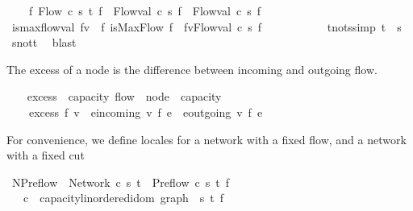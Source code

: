 \begin{isabellebody}
\ \ \ \ {\isacharparenleft}{\isasymforall}f{\isacharprime}{\isachardot}\ Flow\ c\ s\ t\ f{\isacharprime}\ {\isasymlongrightarrow}\ Flow{\isachardot}val\ c\ s\ f{\isacharprime}\ {\isasymle}\ Flow{\isachardot}val\ c\ s\ f{\isacharparenright}{\isachardoublequoteclose}\isanewline
\ \ \ \ \isanewline
\ \ \isamarkupfalse%
\ {\isachardoublequoteopen}is{\isacharunderscore}max{\isacharunderscore}flow{\isacharunderscore}val\ fv\ {\isasymequiv}\ {\isasymexists}f{\isachardot}\ isMaxFlow\ f\ {\isasymand}\ fv{\isacharequal}Flow{\isachardot}val\ c\ s\ f{\isachardoublequoteclose}\isanewline
\isanewline
\ \ \isanewline
\ \ \ \ \isanewline
\ \ \isamarkupfalse%
\ t{\isacharunderscore}not{\isacharunderscore}s{\isacharbrackleft}simp{\isacharbrackright}{\isacharcolon}\ {\isachardoublequoteopen}t\ {\isasymnoteq}\ s{\isachardoublequoteclose}%
\isadelimproof
\ %
\endisadelimproof
%
\isatagproof
{}\isamarkupfalse%
\ s{\isacharunderscore}not{\isacharunderscore}t\ \isamarkupfalse%
\ blast%
\endisatagproof
{\isafoldproof}%
%
\isadelimproof
%
\endisadelimproof
%
\begin{isamarkuptext}%
The excess of a node is the difference between incoming and 
    outgoing flow.%
\end{isamarkuptext}\isamarkuptrue%
\ \ \isamarkupfalse%
\ excess\ {\isacharcolon}{\isacharcolon}\ {\isachardoublequoteopen}{\isacharprime}capacity\ flow\ {\isasymRightarrow}\ node\ {\isasymRightarrow}\ {\isacharprime}capacity{\isachardoublequoteclose}\ \isanewline
\ \ \ \ {\isachardoublequoteopen}excess\ f\ v\ {\isasymequiv}\ {\isacharparenleft}{\isasymSum}e{\isasymin}incoming\ v{\isachardot}\ f\ e{\isacharparenright}\ {\isacharminus}\ {\isacharparenleft}{\isasymSum}e{\isasymin}outgoing\ v{\isachardot}\ f\ e{\isacharparenright}{\isachardoublequoteclose}\isanewline
\ \ \isanewline
{}\isamarkupfalse%
%
\isamarkuptrue%
%
\begin{isamarkuptext}%
For convenience, we define locales for a network with a fixed flow,
  and a network with a fixed cut%
\end{isamarkuptext}\isamarkuptrue%
\isamarkupfalse%
\ NPreflow\ {\isacharequal}\ Network\ c\ s\ t\ {\isacharplus}\ Preflow\ c\ s\ t\ f\ \isanewline
\ \ \ c\ {\isacharcolon}{\isacharcolon}\ {\isachardoublequoteopen}{\isacharprime}capacity{\isacharcolon}{\isacharcolon}linordered{\isacharunderscore}idom\ graph{\isachardoublequoteclose}\ \ s\ t\ f\isanewline

\end{isabellebody}
